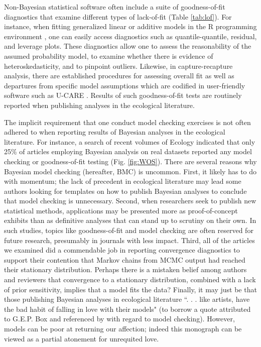\documentclass[12pt,english]{article}
\begin{document}
\begin{spacing}{1.9}
Non-Bayesian statistical software often include a suite of
goodness-of-fit diagnostics that examine different types of
lack-of-fit (Table \ref{tab:lof}).  For instance, when fitting
generalized linear \citep{McCullaghNelder1989} or additive
\citep{Wood2006} models in the R programming environment
\citep{RTeam2015}, one can easily access diagnostics such as
quantile-quantile, residual, and leverage plots.  These diagnostics
allow one to assess the reasonability of the assumed probability
model, to examine whether there is evidence of heteroskedasticity, and
to pinpoint outliers.  Likewise, in capture-recapture analysis, there
are established procedures for assessing overall fit as well as
departures from specific model assumptions which are codified in
user-friendly software such as U-CARE \citep{ChoquetEtAl2009}.
Results of such goodness-of-fit tests are routinely reported when
publishing analyses in the ecological literature.

The implicit requirement that one conduct model checking exercises is
not often adhered to when reporting results of Bayesian analyses in
the ecological literature.  For instance, a search of recent volumes
of Ecology indicated that only 25\% of articles employing Bayesian
analysis on real datasets reported any model checking or
goodness-of-fit testing (Fig. \ref{fig:WOS}).  There are several
reasons why Bayesian model checking (hereafter, BMC) is uncommon.  First, it likely has
to do with momentum; the lack of precedent in ecological literature
may lead some authors looking for templates on how to publish Bayesian
analyses to conclude that model checking is unnecessary.  Second, when
researchers seek to publish new statistical methods, applications may
be presented more as proof-of-concept exhibits than as definitive
analyses that can stand up to scrutiny on their own. In such studies,
topics like goodness-of-fit and model checking are often reserved for
future research, presumably in journals with less impact.  Third, all
of the articles we examined did a commendable job in reporting
convergence diagnostics to support their contention that Markov chains
from MCMC output had reached their stationary distribution.  Perhaps
there is a mistaken belief among authors and reviewers that
convergence to a stationary distribution, combined with a lack of
prior sensitivity, implies that a model fits the data?  Finally, it
may just be that those publishing Bayesian analyses in ecological
literature ``. . . like artists, have the bad habit of falling in love
with their models" (to borrow a quote attributed to G.E.P. Box and
referenced by \citet{LinkBarker2010} with regard to model checking).
However, models can be poor at returning our affection; indeed this
monograph can be viewed as a partial atonement for unrequited love.


\end{spacing}
\end{document}
